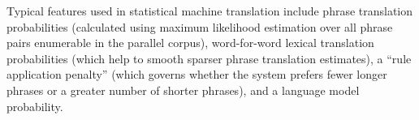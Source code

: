\documentclass[11pt]{article}
\newcommand{\mnote}[1]{\marginpar{%
  \vskip-\baselineskip
  \raggedright\footnotesize
  \itshape\hrule\smallskip\footnotesize{#1}\par\smallskip\hrule}}
\begin{document}
Typical features used in statistical machine translation include
phrase translation probabilities (calculated using maximum likelihood
estimation over all phrase pairs enumerable in the parallel
corpus), word-for-word lexical translation probabilities (which help
to smooth sparser phrase translation estimates), a ``rule application
penalty'' (which governs whether the system prefers fewer longer phrases or a
greater number of shorter phrases), and a language model probability.

  

\end{document}
